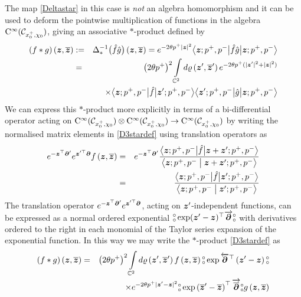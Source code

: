 The map \eqref{Deltastar} in this case is {\it not} an algebra homomorphism and
it can be used to deform the pointwise multiplication of functions in the
algebra ${\rm C}^\infty(\mathcal{C}_{x_0^+,\chi_0})$, giving an associative
$\ast$-product defined by
\begin{eqnarray}
  \label{D3stardef}
  (f*g)\left({{\boldsymbol {z} }},\overline{{{\boldsymbol {z} }}} \right)&:=&
  \Delta_*^{-1}\bigl(\hat f \hat g \bigr)
  \left({{\boldsymbol {z} }},\overline{{{\boldsymbol {z} }}} \right) =  e^{-2\theta p^+ |{{\boldsymbol {z} }}|^2} 
  \bigl\langle{{\boldsymbol {z} }};p^+,p^-\bigl| \hat f \hat g \bigr|{{\boldsymbol {z} }};p^+,p^-
  \bigr\rangle\nonumber\\ &=&\left(2\theta p^+\right)^2 
  \int\limits_{{\mathbb C}^2} d\varrho\left({{\boldsymbol {z} }}',\overline{{{\boldsymbol {z} }}}{}^{ \prime} 
  \right)  e^{-2\theta p^+ (|{{\boldsymbol {z} }}'|^2+|{{\boldsymbol {z} }}|^2)}\nonumber\\
  &&\times \bigl\langle{{\boldsymbol {z} }};p^+,p^-
  \bigl| \hat f \bigr|{{\boldsymbol {z} }}';p^+,p^-\bigr\rangle \bigl\langle
  {{\boldsymbol {z} }}';p^+,p^-\bigl| \hat g \bigr|{{\boldsymbol {z} }};p^+,p^-\bigr\rangle
\end{eqnarray}
We can express this $\ast$-product more explicitly in terms of a bi-differential
operator acting on ${\rm C}^\infty(\mathcal{C}_{x_0^+,\chi_0})\otimes{\rm
  C}^\infty(\mathcal{C}_{x_0^+,\chi_0})\to{\rm
  C}^\infty(\mathcal{C}_{x_0^+,\chi_0})$ by writing the normalised matrix
elements in \eqref{D3stardef} using translation operators as \cite{APS1}
\begin{eqnarray}
  \label{matrixelttransl}
  e^{-{{\boldsymbol {z} }}^\top {{\boldsymbol {\partial} }}'}  e^{{{\boldsymbol {z} }}^{\prime \top} {{\boldsymbol {\partial} }}}
  f\left({{\boldsymbol {z} }},\overline{{{\boldsymbol {z} }}} \right)&=& e^{-{{\boldsymbol {z} }}^\top {{\boldsymbol {\partial} }}'}
  \frac{\bigl\langle{{\boldsymbol {z} }};p^+,p^-
    \bigl| \hat f \bigr|{{\boldsymbol {z} }}+{{\boldsymbol {z} }}';p^+,p^-\bigr\rangle}{
    \bigl\langle{{\boldsymbol {z} }};p^+,p^-\bigm|{{\boldsymbol {z} }}+{{\boldsymbol {z} }}';p^+,p^-\bigr\rangle}\\\nonumber
  &=&
  \frac{\bigl\langle{{\boldsymbol {z} }};p^+,p^-
    \bigl| \hat f \bigr|{{\boldsymbol {z} }}';p^+,p^-\bigr\rangle}{
    \bigl\langle{{\boldsymbol {z} }};p^+,p^-\bigm|{{\boldsymbol {z} }}';p^+,p^-\bigr\rangle}
\end{eqnarray}
The translation operator $ e^{-{{\boldsymbol {z} }}^\top {{\boldsymbol {\partial} }}'} e^{{{\boldsymbol {z} }}^{\prime \top} {{\boldsymbol {\partial} }}}$,
acting on ${{\boldsymbol {z} }}'$-independent functions, can be expressed as a normal ordered
exponential $\mbox{$\substack{\circ\\\circ}$} \exp({{\boldsymbol {z} }}'-{{\boldsymbol {z} }})^\top \overrightarrow{{{\boldsymbol {\partial} }}} \mbox{$\substack{\circ\\\circ}$}$ with
derivatives ordered to the right in each monomial of the Taylor series expansion
of the exponential function. In this way we may write the $\ast$-product
\eqref{D3stardef} as
\begin{eqnarray}
  \nonumber
  (f*g)\left({{\boldsymbol {z} }},\overline{{{\boldsymbol {z} }}} \right)&=&\left(2\theta p^+\right)^2 
  \int\limits_{{\mathbb C}^2} d\varrho\left({{\boldsymbol {z} }}',\overline{{{\boldsymbol {z} }}}{}^{ \prime} 
  \right) f\left({{\boldsymbol {z} }},\overline{{{\boldsymbol {z} }}} \right) \mbox{$\substack{\circ\\\circ}$} \exp
  \overleftarrow{{{\boldsymbol {\partial} }}}{}^{ \top} \left({{\boldsymbol {z} }}'-{{\boldsymbol {z} }}\right) \mbox{$\substack{\circ\\\circ}$}\\
  &&\times  e^{-2\theta p^+ |{{\boldsymbol {z} }}'-{{\boldsymbol {z} }}|^2} \mbox{$\substack{\circ\\\circ}$} \exp\left(
    \overline{{{\boldsymbol {z} }}}{}^{ \prime}-\overline{{{\boldsymbol {z} }}} \right)^\top 
  \overrightarrow{\overline{{{\boldsymbol {\partial} }}}} \mbox{$\substack{\circ\\\circ}$} g\left({{\boldsymbol {z} }},\overline{{{\boldsymbol {z} }}} \right)
  \label{D3starform}
\end{eqnarray}
